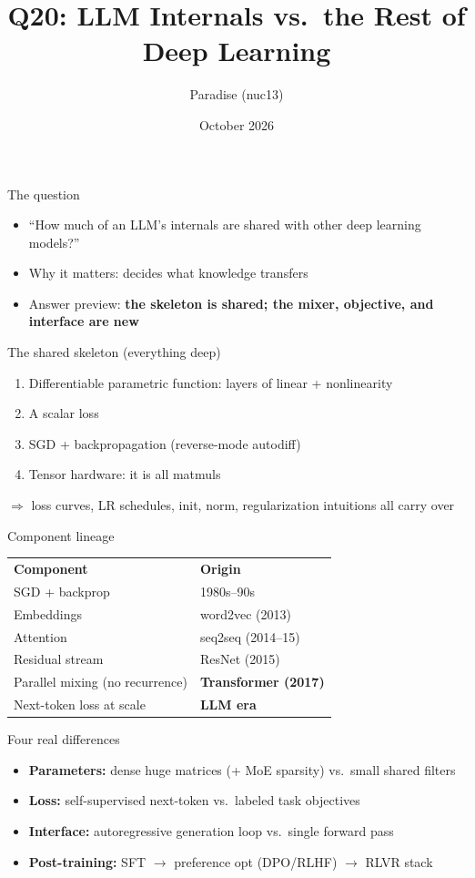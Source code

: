 \documentclass[aspectratio=169,11pt]{beamer}
\title{Q20: LLM Internals vs.\ the Rest of Deep Learning}
\author{Paradise (nuc13)}
\date{October 2026}
\begin{document}
\frame{\titlepage}

\begin{frame}{The question}
\begin{itemize}
\item ``How much of an LLM's internals are shared with other deep learning models?''
\item Why it matters: decides what knowledge transfers
\item Answer preview: \textbf{the skeleton is shared; the mixer, objective, and interface are new}
\end{itemize}
\end{frame}

\begin{frame}{The shared skeleton (everything deep)}
\begin{enumerate}
\item Differentiable parametric function: layers of linear + nonlinearity
\item A scalar loss
\item SGD + backpropagation (reverse-mode autodiff)
\item Tensor hardware: it is all matmuls
\end{enumerate}
\pause
\vspace{1em}
$\Rightarrow$ loss curves, LR schedules, init, norm, regularization intuitions all carry over
\end{frame}

\begin{frame}{Component lineage}
\begin{table}
\begin{tabular}{ll}
\textbf{Component} & \textbf{Origin} \\
SGD + backprop & 1980s--90s \\
Embeddings & word2vec (2013) \\
Attention & seq2seq (2014--15) \\
Residual stream & ResNet (2015) \\
Parallel mixing (no recurrence) & \textbf{Transformer (2017)} \\
Next-token loss at scale & \textbf{LLM era} \\
\end{tabular}
\end{table}
\end{frame}

\begin{frame}{Four real differences}
\begin{itemize}
\item \textbf{Parameters:} dense huge matrices (+ MoE sparsity) vs.\ small shared filters
\item \textbf{Loss:} self-supervised next-token vs.\ labeled task objectives
\item \textbf{Interface:} autoregressive generation loop vs.\ single forward pass
\item \textbf{Post-training:} SFT $\to$ preference opt (DPO/RLHF) $\to$ RLVR stack
\end{itemize}
\end{frame}
\end{document}
